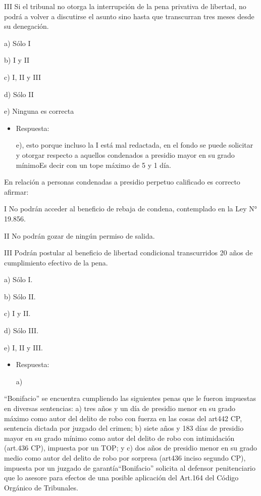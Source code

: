 \documentclass[letterpaper, 11pt]{article}
\begin{document}
III Si el tribunal no otorga la interrupción de la pena privativa de
libertad, no podrá a volver a discutirse el asunto sino hasta que
transcurran tres meses desde su denegación.


a) Sólo I

b) I y II

c) I, II y III

d) Sólo II

e) Ninguna es correcta

\begin{itemize}
\item Respuesta:

e), esto porque incluso la I está mal redactada, en el fondo se
puede solicitar y otorgar respecto a aquellos condenados a presidio
mayor en su grado mínimoEs decir con un tope máximo de 5 y 1 día.
\end{itemize}


En relación a personas condenadas a presidio perpetuo calificado es
correcto afirmar:

I No podrán acceder al beneficio de rebaja de condena, contemplado en
la Ley N° 19.856.

II No podrán gozar de ningún permiso de salida.

III Podrán postular al beneficio de libertad condicional transcurridos
20 años de cumplimiento efectivo de la pena.

a) Sólo I.


b) Sólo II.



c) I y II.


d) Sólo III.



e) I, II y III.


\begin{itemize}
\item Respuesta:

a)
\end{itemize}



“Bonifacio” se encuentra cumpliendo las siguientes penas que le fueron
impuestas en diversas sentencias: a) tres años y un día de presidio
menor en su grado máximo como autor del delito de robo con fuerza en
las cosas del art442 CP, sentencia dictada por juzgado del crimen; b)
siete años y 183 días de presidio mayor en su grado mínimo como autor
del delito de robo con intimidación (art.436 CP), impuesta por un TOP;
y c) dos años de presidio menor en su grado medio como autor del
delito de robo por sorpresa (art436 inciso segundo CP), impuesta por
un juzgado de garantía“Bonifacio” solicita al defensor penitenciario
que lo asesore para efectos de una posible aplicación del Art.164 del
Código Orgánico de Tribunales.
\end{document}
